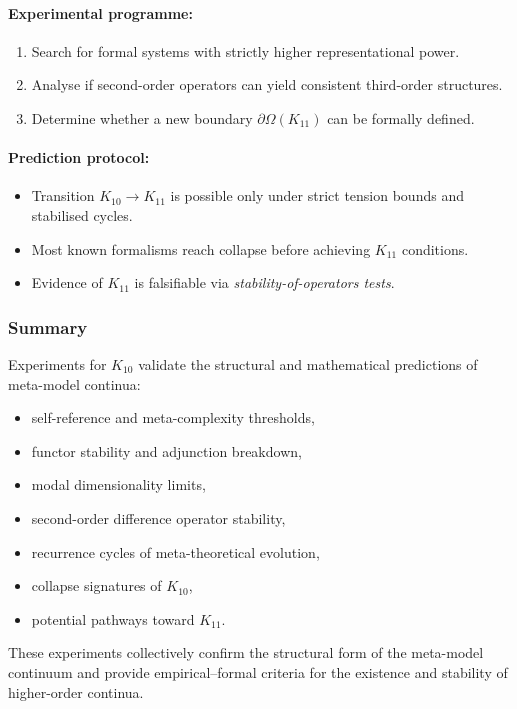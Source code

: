 \paragraph{Experimental programme:}

\begin{enumerate}
    \item Search for formal systems with strictly higher
          representational power.
    \item Analyse if second-order operators can yield consistent
          third-order structures.
    \item Determine whether a new boundary $\partial\Omega(K_{11})$ can
          be formally defined.
\end{enumerate}

\paragraph{Prediction protocol:}

\begin{itemize}
    \item Transition $K_{10} \to K_{11}$ is possible only under
          strict tension bounds and stabilised cycles.
    \item Most known formalisms reach collapse before achieving
          $K_{11}$ conditions.
    \item Evidence of $K_{11}$ is falsifiable via
          \emph{stability-of-operators tests}.
\end{itemize}



\subsubsection{Summary}

Experiments for $K_{10}$ validate the structural and mathematical
predictions of meta-model continua:

\begin{itemize}
    \item self-reference and meta-complexity thresholds,
    \item functor stability and adjunction breakdown,
    \item modal dimensionality limits,
    \item second-order difference operator stability,
    \item recurrence cycles of meta-theoretical evolution,
    \item collapse signatures of $K_{10}$,
    \item potential pathways toward $K_{11}$.
\end{itemize}

These experiments collectively confirm the structural form of the
meta-model continuum and provide empirical–formal criteria for the
existence and stability of higher-order continua.
